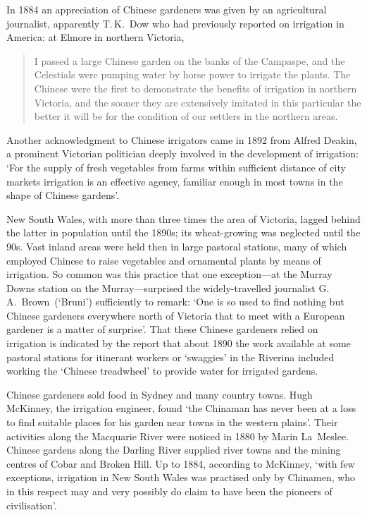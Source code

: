 In 1884 an appreciation of Chinese gardeners was given by an
agricultural journalist, apparently T.\,K.~Dow who had previously
reported on irrigation in America: at Elmore in northern Victoria,
\begin{quote}
	I passed a large Chinese garden on the banks of the Campaspe,
	and the Celestials were pumping water by horse power to
	irrigate the plants.  The Chinese were the first to
	demonstrate the benefits of irrigation in northern Victoria,
	and the sooner they are extensively imitated in this
	particular the better it will be for the condition of our
	settlers in the northern areas.
\end{quote}

Another acknowledgment to Chinese irrigators came in 1892 from Alfred
Deakin, a prominent Victorian politician deeply involved in the
development of irrigation: `For the supply of fresh vegetables from
farms within sufficient distance of city markets irrigation is an
effective agency, familiar enough in most towns in the shape of
Chinese gardens'.

New South Wales, with more than three times the area of Victoria,
lagged behind the latter in population until the 1890s; its
wheat-growing was neglected until the 90s.  Vast inland areas were
held then in large pastoral stations, many of which employed Chinese
to raise vegetables and ornamental plants by means of irrigation.  So
common was this practice that one exception---at the Murray Downs
station on the Murray---surprised the widely-travelled journalist
G.\,A.~Brown~(`Bruni') sufficiently to remark: `One is so used to find
nothing but Chinese gardeners everywhere north of Victoria that to
meet with a European gardener is a matter of surprise'.  That these
Chinese gardeners relied on irrigation is indicated by the report that
about 1890 the work available at some pastoral stations for itinerant
workers or `swaggies' in the Riverina included working the `Chinese
treadwheel' to provide water for irrigated
gardens.

Chinese gardeners sold food in Sydney and many country towns. Hugh
McKinney, the irrigation engineer, found `the Chinaman has never been
at a loss to find suitable places for his garden near towns in the
western plains'.  Their activities along the Macquarie River were
noticed in 1880 by Marin La~Meslee.  Chinese gardens along the Darling
River supplied river towns and the mining centres of Cobar and Broken
Hill.  Up to 1884, according to McKinney, `with few exceptions,
irrigation in New South Wales was practised only by Chinamen, who in
this respect may and very possibly do claim to have been the pioneers
of civilisation'.

